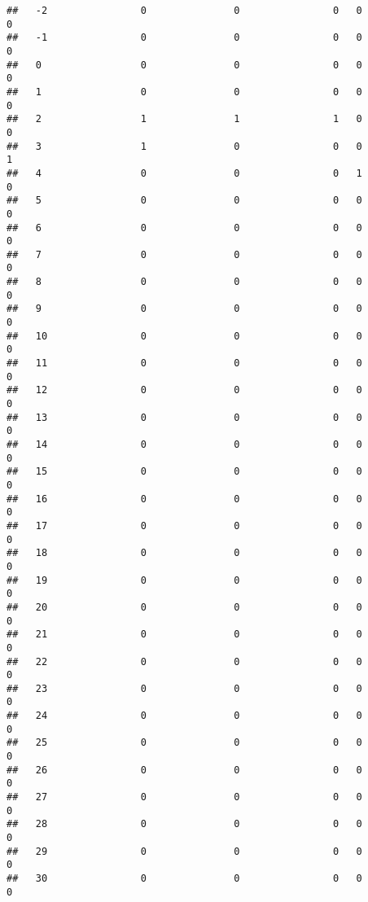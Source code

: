 \documentclass[]{article}
\begin{document}
\begin{verbatim}
##   -2                0               0                0   0                0
##   -1                0               0                0   0                0
##   0                 0               0                0   0                0
##   1                 0               0                0   0                0
##   2                 1               1                1   0                0
##   3                 1               0                0   0                1
##   4                 0               0                0   1                0
##   5                 0               0                0   0                0
##   6                 0               0                0   0                0
##   7                 0               0                0   0                0
##   8                 0               0                0   0                0
##   9                 0               0                0   0                0
##   10                0               0                0   0                0
##   11                0               0                0   0                0
##   12                0               0                0   0                0
##   13                0               0                0   0                0
##   14                0               0                0   0                0
##   15                0               0                0   0                0
##   16                0               0                0   0                0
##   17                0               0                0   0                0
##   18                0               0                0   0                0
##   19                0               0                0   0                0
##   20                0               0                0   0                0
##   21                0               0                0   0                0
##   22                0               0                0   0                0
##   23                0               0                0   0                0
##   24                0               0                0   0                0
##   25                0               0                0   0                0
##   26                0               0                0   0                0
##   27                0               0                0   0                0
##   28                0               0                0   0                0
##   29                0               0                0   0                0
##   30                0               0                0   0                0

\end{verbatim}
\end{document}
